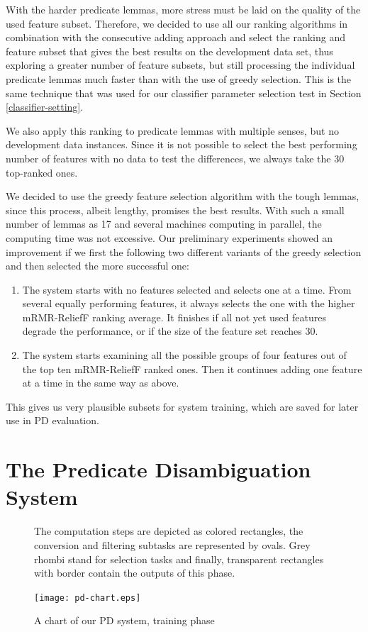 \documentclass[12pt,notitlepage]{report}
\begin{document}
With the harder predicate lemmas, more stress must be laid on the quality of the used feature subset. Therefore, we decided to use all our ranking algorithms in combination with the consecutive adding approach and select the ranking and feature subset that gives the best results on the development data set, thus exploring a greater number of feature subsets, but still processing the individual predicate lemmas much faster than with the use of greedy selection. This is the same technique that was used for our classifier parameter selection test in Section \ref{classifier-setting}. 

We also apply this ranking to predicate lemmas with multiple senses, but no development data instances. Since it is not possible to select the best performing number of features with no data to test the differences, we always take the 30 top-ranked ones.

We decided to use the greedy feature selection algorithm with the tough lemmas, since this process, albeit lengthy, promises the best results. With such a small number of lemmas as 17 and several machines computing in parallel, the computing time was not excessive. Our preliminary experiments showed an improvement if we first the following two different variants of the greedy selection and then selected the more successful one:
\begin{enumerate}
    \item The system starts with no features selected and selects one at a time. From several equally performing features, it always selects the one with the higher mRMR-ReliefF ranking average. It finishes if all not yet used features degrade the performance, or if the size of the feature set reaches 30.
    \item The system starts examining all the possible groups of four features out of the top ten mRMR-ReliefF ranked ones. Then it continues adding one feature at a time in the same way as above.
\end{enumerate}
This gives us very plausible subsets for system training, which are saved for later use in PD evaluation.

\section{The Predicate Disambiguation System}\label{pd-overview}

\begin{figure}[p]
\caption{A chart of our PD system, training phase}\label{fig:pd-schema}
\noindent\footnotesize The computation steps are depicted as colored rectangles, the conversion and filtering subtasks are represented by ovals. Grey rhombi stand for selection tasks and finally, transparent rectangles with border contain the outputs of this phase.
\begin{center}
\texttt{[image: pd-chart.eps]}
\end{center}
\end{figure}
\end{document}
